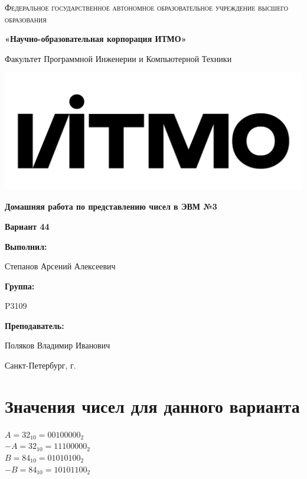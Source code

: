 \documentclass[12pt,a4paper]{report}
\begin{document}
\begin{titlepage}
	\centering
	{
        \scshape
        Федеральное государственное автономное образовательное учреждение высшего образования
        \par
        \textbf{«Научно-образовательная корпорация ИТМО»}
        \par
        \vspace*{1cm}
        Факультет Программной Инженерии и Компьютерной Техники
        \par
    }
    \vspace*{0.6cm}
    \includegraphics[width=\textwidth]{logo.png}
    {
        \Large
        \textbf{Домашняя работа по представлению чисел в ЭВМ №3}
        \par
        \normalsize
        \vspace*{0.75cm}
        \textbf{Вариант 44}
        \par
    }
    \vfill
    \hfill\begin{minipage}{\dimexpr\textwidth-7.8cm}
        \textbf{Выполнил:}\par
        Степанов Арсений Алексеевич\par
        \vspace*{0.15cm}
        \textbf{Группа:}\par
        P3109\par
        \vspace*{0.15cm}
        \textbf{Преподаватель:}\par
        Поляков Владимир Иванович\par
    \end{minipage}
    \vfill
    Санкт-Петербург, \the\year{}г.
\end{titlepage}
\section*{Значения чисел для данного варианта}
\onehalfspacing
$A=32_{10}=00100000_2$\\
$-A=32_{10}=11100000_2$\\
$B=84_{10}=01010100_2$\\
$-B=84_{10}=10101100_2$\\
\end{document}
